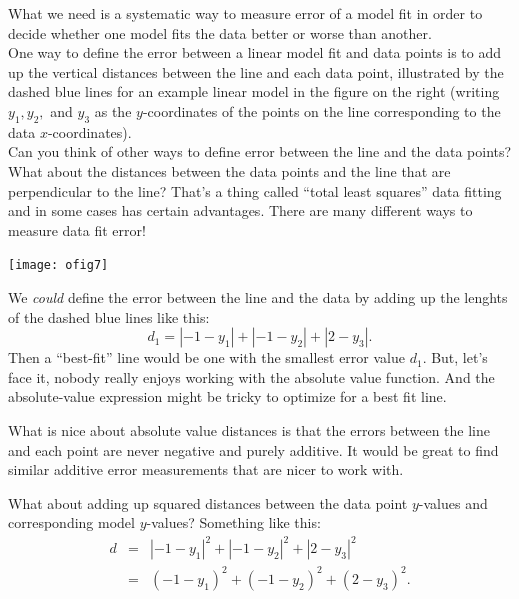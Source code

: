 \documentclass[10pt]{article}
\begin{document}
\begin{minipage}[c]{0.55\textwidth}
What we need is a systematic way to measure error of a model fit in order to
decide whether one model fits the data better or worse than another.\\

One way to define the error between a linear model fit and data points is to
add up the vertical distances between the line and each data point, illustrated
by the dashed blue lines for an example linear model in the figure on the right
(writing $y_1, y_2,$ and $y_3$ as the $y$-coordinates of the points on the line
corresponding to the data $x$-coordinates).\\

Can you think of other ways to define error between the line and the data
points? What about the distances between the data points and the line that are
perpendicular to the line? That's a thing called ``total least squares'' data
fitting and in some cases has certain advantages.
There are many different ways to measure data fit error!

\end{minipage}
\begin{minipage}[c]{0.45\textwidth}
\begin{center}
\texttt{[image: ofig7]}
\end{center}
\end{minipage}

We {\it could} define the error between the line and the data by adding up the lenghts of the dashed blue lines like this:
\[
d_1 = |-1 - y_1| + |-1 -y_2| + |2 - y_3|.
\]
Then a ``best-fit'' line would be one with the smallest error value $d_1$.
But, let's face it, nobody really enjoys working with the absolute value
function. And the absolute-value expression might be tricky to optimize for
a best fit line.

What is nice about absolute value distances
is that the errors between the line and each point are never negative and
purely additive. It would be great to find similar additive error
measurements that are nicer to work with.

What about adding up squared distances between the data point
$y$-values and corresponding model $y$-values? Something like this:
\[
\begin{array}{rcl}
d &=& |-1 - y_1|^2 + |-1 -y_2|^2 + |2 - y_3|^2\\[10pt]
 &=& (-1 - y_1)^2 + (-1 -y_2)^2 + (2 - y_3)^2.
\end{array}
\]
\end{document}
